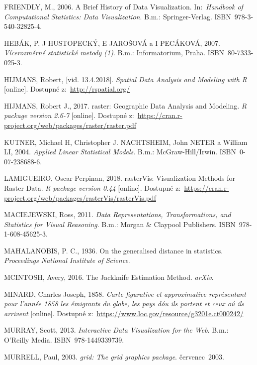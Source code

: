 \documentclass[12pt,]{article}
\begin{document}
\hypertarget{ref-dataviz_history}{}
FRIENDLY, M., 2006. A Brief History of Data Visualization.
In:~\emph{Handbook of Computational Statistics: Data Visualization}.
B.m.: Springer-Verlag. ISBN~978-3-540-32825-4.

\hypertarget{ref-vicerozm_stat}{}
HEBÁK, P, J HUSTOPECKÝ, E JAROŠOVÁ a I PECÁKOVÁ, 2007.
\emph{Vícerozměrné statistické metody (1)}. B.m.: Informatorium, Praha.
ISBN~80-7333-025-3.

\hypertarget{ref-spatial2}{}
HIJMANS, Robert, {[}vid. 13.4.2018{]}. \emph{Spatial Data Analysis and
Modeling with R} {[}online{]}. Dostupné z:~\url{http://rspatial.org/}

\hypertarget{ref-raster}{}
HIJMANS, Robert J., 2017. raster: Geographic Data Analysis and Modeling.
\emph{R package version 2.6-7} {[}online{]}. Dostupné
z:~\url{https://cran.r-project.org/web/packages/raster/raster.pdf}

\hypertarget{ref-kutner_transform}{}
KUTNER, Michael H, Christopher J. NACHTSHEIM, John NETER a William LI,
2004. \emph{Applied Linear Statistical Models}. B.m.: McGraw-Hill/Irwin.
ISBN~0-07-238688-6.

\hypertarget{ref-rasterVis}{}
LAMIGUEIRO, Oscar Perpinan, 2018. rasterVis: Visualization Methods for
Raster Data. \emph{R package version 0.44} {[}online{]}. Dostupné
z:~\url{https://cran.r-project.org/web/packages/rasterVis/rasterVis.pdf}

\hypertarget{ref-datarep2011}{}
MACIEJEWSKI, Ross, 2011. \emph{Data Representations, Transformations,
and Statistics for Visual Reasoning}. B.m.: Morgan \& Claypool
Publishers. ISBN~978-1-608-45625-3.

\hypertarget{ref-mbdist}{}
MAHALANOBIS, P. C., 1936. On the generalised distance in statistics.
\emph{Proceedings National Institute of Science}.

\hypertarget{ref-mcintosh2016}{}
MCINTOSH, Avery, 2016. The Jackknife Estimation Method. \emph{arXiv}.

\hypertarget{ref-minard1858}{}
MINARD, Charles Joseph, 1858. \emph{Carte figurative et approximative
représentant pour l'année 1858 les émigrants du globe, les pays dóu ils
partent et ceux oú ils arrivent} {[}online{]}. Dostupné
z:~\url{https://www.loc.gov/resource/g3201e.ct000242/}

\hypertarget{ref-murray}{}
MURRAY, Scott, 2013. \emph{Interactive Data Visualization for the Web}.
B.m.: O'Reilly Media. ISBN~978-1449339739.

\hypertarget{ref-murrell2003}{}
MURRELL, Paul, 2003. \emph{grid: The grid graphics package}.
červenec~2003.
\end{document}
